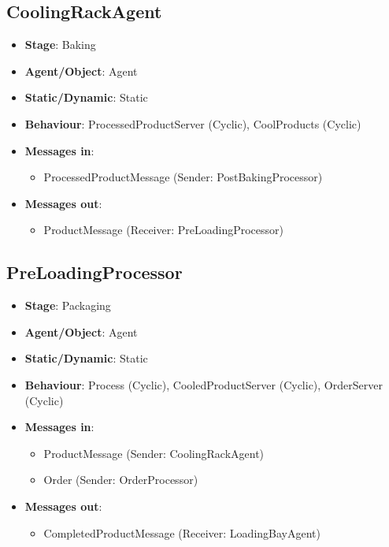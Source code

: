 \documentclass[12pt]{article}
\begin{document}
\subsection{CoolingRackAgent}
\begin{itemize}
    \item \textbf{Stage}: Baking
    \item \textbf{Agent/Object}: Agent
    \item \textbf{Static/Dynamic}: Static
    \item \textbf{Behaviour}: ProcessedProductServer (Cyclic), CoolProducts (Cyclic)
    \item \textbf{Messages in}:
        \begin{itemize}
            \item ProcessedProductMessage (Sender: PostBakingProcessor)
        \end{itemize}
    \item \textbf{Messages out}:
        \begin{itemize}
            \item ProductMessage (Receiver: PreLoadingProcessor)
        \end{itemize}
\end{itemize}
\newpage{}

\subsection{PreLoadingProcessor}
\begin{itemize}
    \item \textbf{Stage}: Packaging
    \item \textbf{Agent/Object}: Agent
    \item \textbf{Static/Dynamic}: Static
    \item \textbf{Behaviour}: Process (Cyclic), CooledProductServer (Cyclic), OrderServer (Cyclic)
    \item \textbf{Messages in}:
        \begin{itemize}
            \item ProductMessage (Sender: CoolingRackAgent)
            \item Order (Sender: OrderProcessor)
        \end{itemize}
    \item \textbf{Messages out}:
        \begin{itemize}
            \item CompletedProductMessage (Receiver: LoadingBayAgent)
        \end{itemize}
\end{itemize}
\newpage{}
\end{document}
